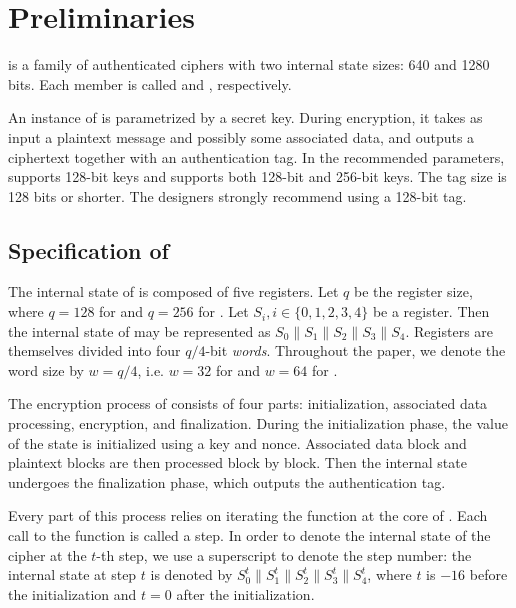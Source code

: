 
\section{Preliminaries}
\label{sec/Preliminaries}

\MORUS \cite{MORUS} is a family of authenticated ciphers with two internal state sizes: 640 and 1280 bits.
Each member is called \MORUS[640] and \MORUS[1280], respectively.

An instance of \MORUS is parametrized by a secret key. During encryption, it takes as input a plaintext message and possibly some associated data, and outputs a ciphertext together with an authentication tag.
In the recommended parameters, \MORUS[640] supports 128-bit keys and \MORUS[1280] supports both 128-bit and 256-bit keys. The tag size is 128 bits or shorter. The designers strongly recommend using a 128-bit tag.

\subsection{Specification of \MORUS}
\label{subsec/Spec}

The internal state of \MORUS is composed of five registers. Let $q$ be the register size, where $q = 128$ for \MORUS[640] and $q=256$ for \MORUS[1280]. Let $S_i, i \in\{0,1,2,3,4\}$ be a register. Then the internal state of \MORUS may be represented as $S_0\|S_1\|S_2\|S_3\|S_4$.
Registers are themselves divided into four $q/4$-bit \emph{words}.
Throughout the paper, we denote the word size by $w = q/4$, i.e. $w=32$ for \MORUS[640] and $w=64$ for \MORUS[1280].

The encryption process of \MORUS consists of four parts: initialization, associated data processing, encryption, and finalization. 
During the initialization phase, the value of the state is initialized using a key and nonce.
Associated data block and plaintext blocks are then processed block by block.
Then the internal state undergoes the finalization phase, which outputs the authentication tag.

Every part of this process relies on iterating the \StateUpdate{} function at the core of \MORUS. Each call to the \StateUpdate{} function is called a step.
In order to denote the internal state of the cipher at the $t$-th step, we use a superscript to denote the step number: the internal state at step $t$ is denoted by $S^t_0\|S^t_1\|S^t_2\|S^t_3\|S^t_4$, where $t$ is $-16$ before the initialization and $t=0$ after the initialization.

